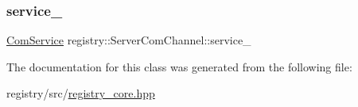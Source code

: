 \subsubsection{\texorpdfstring{service\+\_\+}{service\_}}
{\footnotesize\ttfamily \hyperlink{classregistry_1_1ComService}{Com\+Service} registry\+::\+Server\+Com\+Channel\+::service\+\_\+\hspace{0.3cm}{\ttfamily [private]}}



The documentation for this class was generated from the following file\+:\begin{DoxyCompactItemize}
\item 
registry/src/\hyperlink{registry__core_8hpp}{registry\+\_\+core.\+hpp}\end{DoxyCompactItemize}
